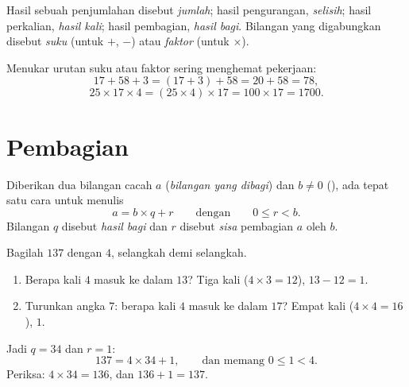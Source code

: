 \begin{remark}[Kosakata]
Hasil sebuah penjumlahan disebut \emph{jumlah}; hasil
pengurangan, \emph{selisih}; hasil perkalian,
\emph{hasil kali}; hasil pembagian,
\emph{hasil bagi}. Bilangan yang digabungkan disebut
\emph{suku} (untuk $+$, $-$) atau \emph{faktor} (untuk $\times$).
\end{remark}

\begin{example}\label{ex:g6:wholes:smart}
Menukar urutan suku atau faktor sering menghemat pekerjaan:
\[
17 + 58 + 3 = (17 + 3) + 58 = 20 + 58 = 78 ,
\]
\[
25 \times 17 \times 4 = (25 \times 4) \times 17 = 100 \times 17 = 1700 .
\]
\end{example}

\section{Pembagian}

\begin{theorem}\label{thm:g6:wholes:division}
Diberikan dua bilangan cacah $a$ (\emph{bilangan yang dibagi}) dan
$b \neq 0$ (\emph{}), ada tepat satu cara untuk menulis
\[
a = b \times q + r
\qquad\text{dengan}\qquad
0 \leq r < b .
\]
Bilangan $q$ disebut \emph{hasil bagi} dan $r$
disebut \emph{sisa} pembagian $a$ oleh $b$.
\end{theorem}
\admitted

\begin{example}\label{ex:g6:wholes:division}
Bagilah $137$ dengan $4$, selangkah demi selangkah.
\begin{enumerate}
  \item Berapa kali $4$ masuk ke dalam $13$? Tiga kali
        ($4 \times 3 = 12$),  $13 - 12 = 1$.
  \item Turunkan angka $7$: berapa kali $4$ masuk ke dalam $17$?
        Empat kali ($4 \times 4 = 16$),  $1$.
\end{enumerate}
Jadi $q = 34$ dan $r = 1$:
\[
137 = 4 \times 34 + 1, \qquad\text{dan memang } 0 \leq 1 < 4 .
\]
Periksa: $4 \times 34 = 136$, dan $136 + 1 = 137$.
\end{example}

